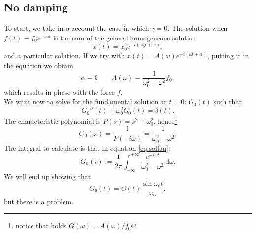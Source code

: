 \documentclass[a4paper,11pt]{article}	%
\theoremstyle{classicthm}
\theoremstyle{definition}
\theoremstyle{definition}
\newcommand{\dd}{\mathrm d}
\renewcommand{\phi}{\varphi}
\begin{document}
\subsection{No damping}

To start, we take into account the case in which $\gamma=0$. The solution when $f(t)=f_0e^{-i\omega t}$ is the sum of the general homogeneous solution
\[	x(t)=x_0e^{-i(\omega_0 t+\phi)},			\]
and a particular solution. If we try with $x(t)=A(\omega)e^{-i(\omega t+\alpha)}$, putting it in the equation we obtain \[\alpha=0\qquad A(\omega)=\frac1{\omega_0^2-\omega^2}f_0, \]
which results in phase with the force $f$.\\

\noindent We want now to solve for the fundamental solution at $t=0$: $G_0(t)$ such that
\[	G_0''(t)+\omega_0^2G_0(t)=\delta(t).		\]
The characteristic polynomial is $P(s)=s^2+\omega_0^2$, hence\footnote{notice that holds $G(\omega)=A(\omega)/{f_0}$ }
\begin{equation}
G_0(\omega)=\frac1{P(-i\omega)}=\frac1{\omega_0^2-\omega^2}.\label{eq:Gomegazero}
\end{equation}
The integral to calculate is that in equation \eqref{eq:solfou}:
\[G_0(t):=\frac1{2\pi}\int_{-\infty}^{+\infty}\frac{e^{-i\omega t}}{\omega_0^2-\omega^2}\,\dd\omega.\]
We will end up showing that
\[	G_0(t)=\Theta( t)\frac{\sin\omega_0t}{\omega_0},		\]
but there is a problem.\\
\end{document}
